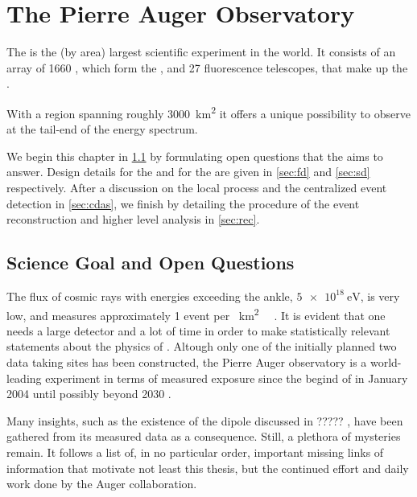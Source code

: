 
\chapter{The Pierre Auger Observatory}
\label{chap:pierre-auger-observatory}

The \PAO is the (by area) largest scientific experiment in the world. It 
consists of an array of 1660 \WCDs, which form the \SD, and 27 fluorescence 
telescopes, that make up the \FD.

With a region spanning roughly \SI{3000}{\kilo\meter\squared} it offers a unique
possibility to observe \UHECRs at the tail-end of the \CR energy spectrum. 

We begin this chapter in \cref{sec:science-case} by formulating open questions 
that the \PAO aims to answer. Design details for the \FD and for the \SD are 
given in \cref{sec:fd} and \cref{sec:sd} respectively. After a discussion on the
local \DAQ process and the centralized event detection in \cref{sec:cdas}, we 
finish by detailing the procedure of the event reconstruction and higher level 
analysis in \cref{sec:rec}.

\section{Science Goal and Open Questions}
\label{sec:science-case}

The flux of cosmic rays with energies exceeding the ankle, $\SI{5e18}{\eV}$, is 
very low, and measures approximately 1 event per \SI{}{\km\squared\sr\year}
\cite{Fenu2023}. It is evident that one needs a large detector and a lot of time
in order to make statistically relevant statements about the physics of \UHECRs.
Altough only one of the initially planned two data taking sites 
\cite[for white paper see][]{Zavrtanik2000} has been constructed, the Pierre
Auger observatory is a world-leading experiment in terms of measured exposure 
since the begind of \DAQ in January 2004 \cite{Abraham2004} until possibly 
beyond 2030 \cite{Castellina2023}.

Many insights, such as the existence of the \CR dipole discussed in ?????
, 
have been gathered from its measured data as a consequence.
Still, a plethora of mysteries remain. It follows a list of, in no particular
order, important missing links of information that motivate not least this
thesis, but the continued effort and daily work done by the Auger collaboration.


